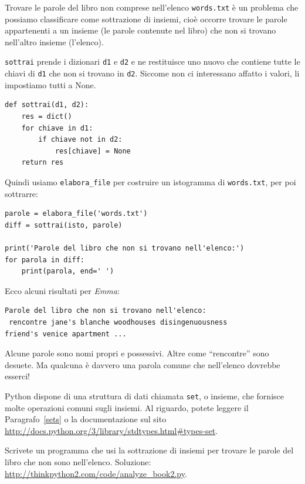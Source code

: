 \documentclass[10pt]{book}
\begin{document}
Trovare le parole del libro non comprese nell'elenco {\tt words.txt} è un problema che possiamo classificare come sottrazione di insiemi, cioè occorre trovare le parole appartenenti a un insieme (le parole contenute nel libro) che non si trovano nell'altro insieme (l'elenco).

{\tt sottrai} prende i dizionari {\tt d1} e {\tt d2} e ne restituisce uno nuovo che contiene tutte le chiavi di {\tt d1} che non si trovano in {\tt d2}.  Siccome non ci interessano affatto i valori, li impostiamo tutti a None.

\begin{verbatim}
def sottrai(d1, d2):
    res = dict()
    for chiave in d1:
        if chiave not in d2:
            res[chiave] = None
    return res
\end{verbatim}
%
Quindi usiamo \verb"elabora_file" per costruire un istogramma di
{\tt words.txt}, per poi sottrarre:

\begin{verbatim}
parole = elabora_file('words.txt')
diff = sottrai(isto, parole)

print('Parole del libro che non si trovano nell'elenco:')
for parola in diff:
    print(parola, end=' ')
\end{verbatim}
%
Ecco alcuni risultati per {\em Emma}:

\begin{verbatim}
Parole del libro che non si trovano nell'elenco:
 rencontre jane's blanche woodhouses disingenuousness 
friend's venice apartment ...
\end{verbatim}
%
Alcune parole sono nomi propri e possessivi. Altre come ``rencontre'' sono desuete. Ma qualcuna è davvero una parola comune che nell'elenco dovrebbe esserci!

\vspace{0.2in}
\begin{exercise}

Python dispone di una struttura di dati chiamata {\tt set}, o insieme, che fornisce molte operazioni comuni sugli insiemi. Al riguardo, potete leggere il Paragrafo~\ref{sets} o la documentazione sul sito  
\url{http://docs.python.org/3/library/stdtypes.html#types-set}. 

Scrivete un programma che usi la sottrazione di insiemi per trovare le parole del libro che non sono nell'elenco. Soluzione:
\url{http://thinkpython2.com/code/analyze_book2.py}.

\end{exercise}
\end{document}
